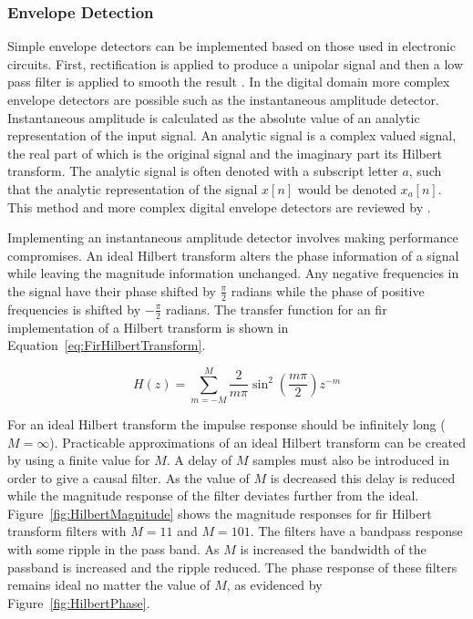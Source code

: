 		\subsubsection*{Envelope Detection}
			Simple envelope detectors can be implemented based on those used in electronic circuits. First,
			rectification is applied to produce a unipolar signal and then a low pass filter is applied to
			smooth the result \citep{dutilleux2011modulators}. In the digital domain more complex envelope
			detectors are possible such as the instantaneous amplitude detector. Instantaneous amplitude is
			calculated as the absolute value of an analytic representation of the input signal. An analytic
			signal is a complex valued signal, the real part of which is the original signal and the imaginary
			part its Hilbert transform. The analytic signal is often denoted with a subscript letter $a$, such
			that the analytic representation of the signal $x[n]$ would be denoted $x_{a}[n]$. This method and
			more complex digital envelope detectors are reviewed by \citet{chang2007a}. 

			Implementing an instantaneous amplitude detector involves making performance compromises. An ideal
			Hilbert transform alters the phase information of a signal while leaving the magnitude information
			unchanged. Any negative frequencies in the signal have their phase shifted by $\frac{\pi}{2}$
			radians while the phase of positive frequencies is shifted by $-\frac{\pi}{2}$ radians. The
			transfer function for an \acrshort{fir} implementation of a Hilbert transform is shown in
			Equation~\ref{eq:FirHilbertTransform}.

			\begin{equation}
				H(z) = \sum_{m = -M}^{M} \frac{2}{m\pi} \sin^{2} \left( \frac{m\pi}{2} \right) z^{-m}
				\label{eq:FirHilbertTransform}
			\end{equation}

			For an ideal Hilbert transform the impulse response should be infinitely long ($M = \infty$).
			Practicable approximations of an ideal Hilbert transform can be created by using a finite value for
			$M$. A delay of $M$ samples must also be introduced in order to give a causal filter. As the value
			of $M$ is decreased this delay is reduced while the magnitude response of the filter deviates
			further from the ideal. Figure~\ref{fig:HilbertMagnitude} shows the magnitude responses for
			\acrshort{fir} Hilbert transform filters with $M = 11$ and $M = 101$. The filters have a bandpass
			response with some ripple in the pass band. As $M$ is increased the bandwidth of the passband is
			increased and the ripple reduced. The phase response of these filters remains ideal no matter the
			value of $M$, as evidenced by Figure~\ref{fig:HilbertPhase}.

